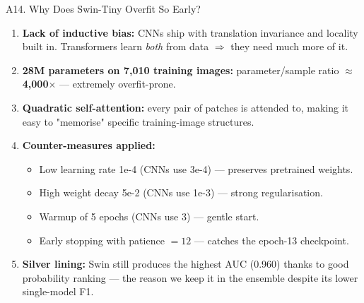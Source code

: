 \documentclass[10pt, aspectratio=169]{beamer}
\begin{document}
\begin{frame}{A14. Why Does Swin-Tiny Overfit So Early?}
    \footnotesize
    \begin{enumerate}
        \item \textbf{Lack of inductive bias:} CNNs ship with translation invariance and locality built in. Transformers learn \textit{both} from data $\Rightarrow$ they need much more of it.
        \item \textbf{28M parameters on 7,010 training images:} parameter/sample ratio $\approx$ \textbf{4,000$\times$} --- extremely overfit-prone.
        \item \textbf{Quadratic self-attention:} every pair of patches is attended to, making it easy to "memorise" specific training-image structures.
        \item \textbf{Counter-measures applied:}
        \begin{itemize}\scriptsize
            \item Low learning rate 1e-4 (CNNs use 3e-4) --- preserves pretrained weights.
            \item High weight decay 5e-2 (CNNs use 1e-3) --- strong regularisation.
            \item Warmup of 5 epochs (CNNs use 3) --- gentle start.
            \item Early stopping with patience $= 12$ --- catches the epoch-13 checkpoint.
        \end{itemize}
        \item \textbf{Silver lining:} Swin still produces the highest AUC (0.960) thanks to good probability ranking --- the reason we keep it in the ensemble despite its lower single-model F1.
    \end{enumerate}
\end{frame}
\end{document}
